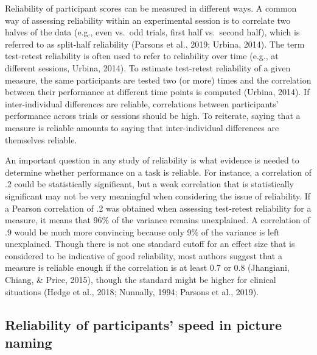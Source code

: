 \documentclass[
  man,floatsintext]{apa6}
\begin{document}
Reliability of participant scores can be measured in different ways. A common way of assessing reliability within an experimental session is to correlate two halves of the data (e.g., even vs.~odd trials, first half vs.~second half), which is referred to as split-half reliability (Parsons et al., 2019; Urbina, 2014). The term test-retest reliability is often used to refer to reliability over time (e.g., at different sessions, Urbina, 2014). To estimate test-retest reliability of a given measure, the same participants are tested two (or more) times and the correlation between their performance at different time points is computed (Urbina, 2014). If inter-individual differences are reliable, correlations between participants' performance across trials or sessions should be high. To reiterate, saying that a measure is reliable amounts to saying that inter-individual differences are themselves reliable.

An important question in any study of reliability is what evidence is needed to determine whether performance on a task is reliable. For instance, a correlation of .2 could be statistically significant, but a weak correlation that is statistically significant may not be very meaningful when considering the issue of reliability. If a Pearson correlation of .2 was obtained when assessing test-retest reliability for a measure, it means that 96\% of the variance remains unexplained. A correlation of .9 would be much more convincing because only 9\% of the variance is left unexplained. Though there is not one standard cutoff for an effect size that is considered to be indicative of good reliability, most authors suggest that a measure is reliable enough if the correlation is at least 0.7 or 0.8 (Jhangiani, Chiang, \& Price, 2015), though the standard might be higher for clinical situations (Hedge et al., 2018; Nunnally, 1994; Parsons et al., 2019).

\hypertarget{reliability-of-participants-speed-in-picture-naming}{%
\subsection{Reliability of participants' speed in picture naming}\label{reliability-of-participants-speed-in-picture-naming}}
\end{document}
